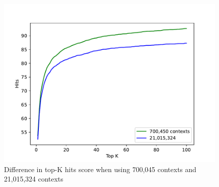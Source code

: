 \documentclass[3p, sort&compress, 12pt]{elsarticle}
\begin{document}
\begin{figure}
	\centering
	\includegraphics[scale=0.7]{images/PDF/experiments/700Kvs21M.pdf}
	\caption {Difference in top-K hits score when using 700,045 contexts and 21,015,324 contexts}
	\label{fig:18}
\end{figure}
\end{document}
